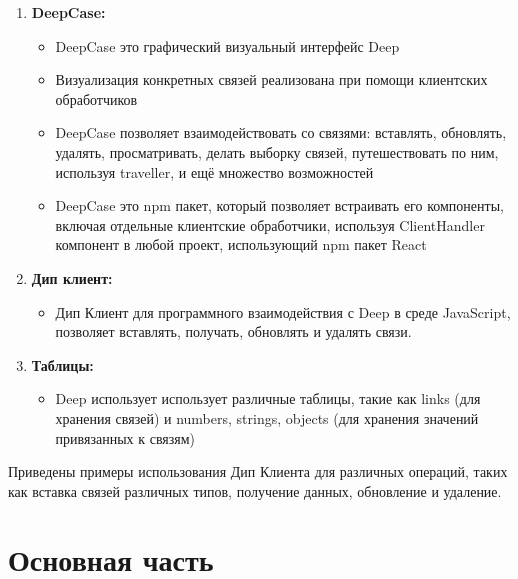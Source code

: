 \documentclass{article}
\begin{document}
\begin{enumerate}
  \item \textbf{DeepCase:}
        \begin{itemize}
          \item DeepCase это графический визуальный интерфейс Deep
          \item Визуализация конкретных связей реализована при помощи клиентских обработчиков
          \item DeepCase позволяет взаимодействовать со связями: вставлять,
          обновлять, удалять, просматривать, делать выборку связей, путешествовать по ним, используя traveller, и ещё множество возможностей
          \item DeepCase это npm пакет, который позволяет встраивать его компоненты, включая отдельные клиентские обработчики, используя ClientHandler компонент в любой проект, использующий npm пакет React
        \end{itemize}

  \item \textbf{Дип клиент:}
        \begin{itemize}
          \item Дип Клиент для программного взаимодействия с Deep в среде
                JavaScript, позволяет вставлять, получать, обновлять и удалять
                связи.
        \end{itemize}

  \item \textbf{Таблицы:}
        \begin{itemize}
          \item Deep использует использует различные таблицы, такие как links (для хранения связей) и numbers, strings, objects (для хранения значений привязанных к связям)
        \end{itemize}
\end{enumerate}

Приведены примеры использования Дип Клиента для различных операций, таких как
вставка связей различных типов, получение данных, обновление и удаление.


\tableofcontents

\section{Основная часть}
\end{document}
